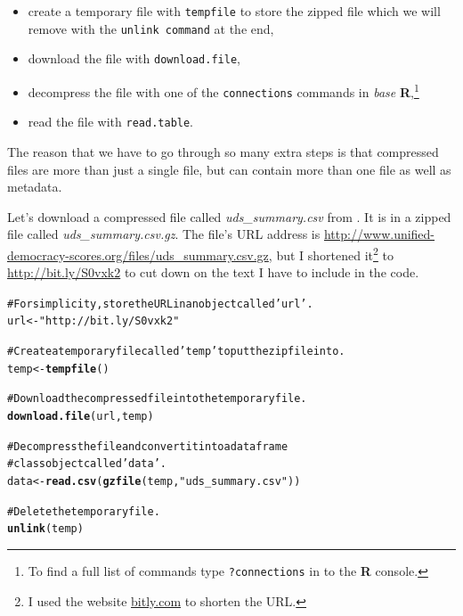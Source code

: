 \documentclass[ChapterTOCs,krantz1]{krantz}\usepackage{graphicx, color}
\makeatletter
\newcommand{\hlfunctioncall}[1]{\textcolor[rgb]{0.501960784313725,0,0.329411764705882}{\textbf{#1}}}%
\newcommand{\hlstring}[1]{\textcolor[rgb]{0.6,0.6,1}{#1}}%
\newcommand{\hlcomment}[1]{\textcolor[rgb]{0.180392156862745,0.6,0.341176470588235}{#1}}%
\newenvironment{kframe}{%
 \def\at@end@of@kframe{}%
 \ifinner\ifhmode%
  \def\at@end@of@kframe{\end{minipage}}%
  \begin{minipage}{\columnwidth}%
 \fi\fi%
 \def\FrameCommand##1{\hskip\@totalleftmargin \hskip-\fboxsep
 \colorbox{shadecolor}{##1}\hskip-\fboxsep
     \hskip-\linewidth \hskip-\@totalleftmargin \hskip\columnwidth}%
 \MakeFramed {\advance\hsize-\width
   \@totalleftmargin\z@ \linewidth\hsize
   \@setminipage}}%
 {\par\unskip\endMakeFramed%
 \at@end@of@kframe}
\newenvironment{knitrout}{}{} %
\makeatother
\begin{document}
\begin{itemize}
    \item create a temporary file with {\tt{tempfile}} to store the zipped file which we will remove with the {\tt{unlink command}} at the end,
    \item download the file with {\tt{download.file}},
    \item decompress the file with one of the {\tt{connections}} commands in {\emph{base}} {\bf{R}},\footnote{To find a full list of commands type {\tt{?connections}} in to the {\bf{R}} console.}
    \item read the file with {\tt{read.table}}. 
\end{itemize}

The reason that we have to go through so many extra steps is that compressed files are more than just a single file, but can contain more than one file as well as metadata.

Let's download a compressed file called {\emph{uds\_summary.csv}} from \cite{Pemstein2010}. It is in a zipped file called {\emph{uds\_summary.csv.gz}}. The file's URL address is {\url{http://www.unified-democracy-scores.org/files/uds_summary.csv.gz}}, but I shortened it\footnote{I used the website \url{bitly.com} to shorten the URL.} to \url{http://bit.ly/S0vxk2} to cut down on the text I have to include in the code.

\begin{knitrout}
\color{fgcolor}\begin{kframe}
\begin{alltt}
\hlcomment{# For simplicity, store the URL in an object called \hlstring{'url'}.}
url <- \hlstring{"http://bit.ly/S0vxk2"}

\hlcomment{# Create a temporary file called \hlstring{'temp'} to put the zip file into.}
temp <- \hlfunctioncall{tempfile}()

\hlcomment{# Download the compressed file into the temporary file.}
\hlfunctioncall{download.file}(url, temp)

\hlcomment{# Decompress the file and convert it into a dataframe}
\hlcomment{# class object called \hlstring{'data'}.}
data <- \hlfunctioncall{read.csv}(\hlfunctioncall{gzfile}(temp, \hlstring{"uds_summary.csv"}))

\hlcomment{# Delete the temporary file.}
\hlfunctioncall{unlink}(temp)
\end{alltt}
\end{kframe}
\end{knitrout}
\end{document}
